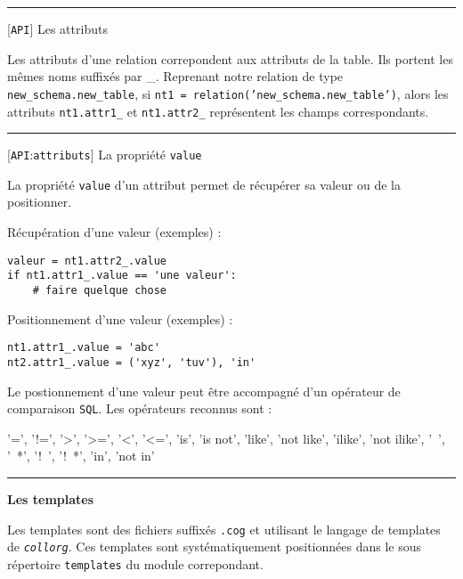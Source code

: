 \documentclass[a4paper]{letter}
\newcommand{\section}[1]{
\rule{0.5cm}{0.1pt} \textbf{\large {#1}} \hrulefill
}
\newcommand{\subsection}[2]{
\rule{0.5cm}{0.1pt} {\scriptsize [{#1}]} {#2}
}
\newcommand{\collorg}{\texttt{\textit{collorg}}}
\newcommand{\API}{\texttt{API}}
\newcommand{\attributs}{\texttt{attributs}}
\begin{document}
\begin{multicols}{3}
\subsection{\API}{Les attributs}

Les attributs d'une relation correpondent aux attributs de la table. Ils portent les mêmes noms suffixés par \_. Reprenant notre relation de type \texttt{new\_schema.new\_table}, si \texttt{nt1~=~relation('new\_schema.new\_table')}, alors les attributs \texttt{nt1.attr1\_} et \texttt{nt1.attr2\_} représentent les champs correspondants.

\subsection{\API:\attributs}{La propriété \texttt{value}}

La propriété \texttt{value} d'un attribut permet de récupérer sa valeur ou de la positionner.

Récupération d'une valeur (exemples) :

\begin{scriptsize}
\begin{verbatim}
valeur = nt1.attr2_.value
if nt1.attr1_.value == 'une valeur':
    # faire quelque chose
\end{verbatim}
\end{scriptsize}

Positionnement d'une valeur (exemples) :

\begin{scriptsize}
\begin{verbatim}
nt1.attr1_.value = 'abc'
nt2.attr1_.value = ('xyz', 'tuv'), 'in'
\end{verbatim}
\end{scriptsize}

Le postionnement d'une valeur peut être accompagné d'un opérateur de comparaison \texttt{SQL}. Les opérateurs reconnus sont :

\begin{scriptsize}
'=', '!=', '>', '>=', '<', '<=', 'is', 'is not', 'like', 'not like',
'ilike', 'not ilike', '~', '~*', '!~', '!~*', 'in', 'not in'
\end{scriptsize}

\section{Les templates}

Les templates sont des fichiers suffixés \texttt{.cog} et utilisant le langage de templates de \collorg. Ces templates sont systématiquement positionnées dans le sous répertoire \texttt{templates} du module correpondant.


\end{multicols}
\end{document}

